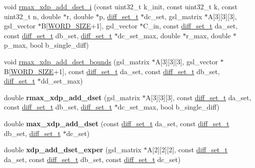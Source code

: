 \begin{DoxyCompactItemize}
\item 
void \hyperlink{xdp-add-diff-set_8cc_a17545da84d6f6dec510d4363ea09e75a}{rmax\-\_\-xdp\-\_\-add\-\_\-dset\-\_\-i} (const uint32\-\_\-t k\-\_\-init, const uint32\-\_\-t k, const uint32\-\_\-t n, double $\ast$r, double $\ast$p, \hyperlink{structdiff__set__t}{diff\-\_\-set\-\_\-t} $\ast$dc\-\_\-set, gsl\-\_\-matrix $\ast$\-A\mbox{[}3\mbox{]}\mbox{[}3\mbox{]}\mbox{[}3\mbox{]}, gsl\-\_\-vector $\ast$\-B\mbox{[}\hyperlink{common_8hh_a92ed8507d1cd2331ad09275c5c4c1c89}{\-W\-O\-R\-D\-\_\-\-S\-I\-Z\-E}+1\mbox{]}, gsl\-\_\-vector $\ast$\-C\-\_\-in, const \hyperlink{structdiff__set__t}{diff\-\_\-set\-\_\-t} da\-\_\-set, const \hyperlink{structdiff__set__t}{diff\-\_\-set\-\_\-t} db\-\_\-set, \hyperlink{structdiff__set__t}{diff\-\_\-set\-\_\-t} $\ast$dc\-\_\-set\-\_\-max, double $\ast$r\-\_\-max, double $\ast$p\-\_\-max, bool b\-\_\-single\-\_\-diff)
\item 
void \hyperlink{xdp-add-diff-set_8cc_a4c95cfd8f710bd876c373a5279ab9075}{rmax\-\_\-xdp\-\_\-add\-\_\-dset\-\_\-bounds} (gsl\-\_\-matrix $\ast$\-A\mbox{[}3\mbox{]}\mbox{[}3\mbox{]}\mbox{[}3\mbox{]}, gsl\-\_\-vector $\ast$\-B\mbox{[}\hyperlink{common_8hh_a92ed8507d1cd2331ad09275c5c4c1c89}{\-W\-O\-R\-D\-\_\-\-S\-I\-Z\-E}+1\mbox{]}, const \hyperlink{structdiff__set__t}{diff\-\_\-set\-\_\-t} da\-\_\-set, const \hyperlink{structdiff__set__t}{diff\-\_\-set\-\_\-t} db\-\_\-set, \hyperlink{structdiff__set__t}{diff\-\_\-set\-\_\-t} $\ast$dd\-\_\-set\-\_\-max)
\item 
\hypertarget{xdp-add-diff-set_8cc_aaa950f2ce67c8a69f7c1cf2a880e7a38}{double {\bfseries rmax\-\_\-xdp\-\_\-add\-\_\-dset} (gsl\-\_\-matrix $\ast$\-A\mbox{[}3\mbox{]}\mbox{[}3\mbox{]}\mbox{[}3\mbox{]}, const \hyperlink{structdiff__set__t}{diff\-\_\-set\-\_\-t} da\-\_\-set, const \hyperlink{structdiff__set__t}{diff\-\_\-set\-\_\-t} db\-\_\-set, \hyperlink{structdiff__set__t}{diff\-\_\-set\-\_\-t} $\ast$dc\-\_\-set\-\_\-max, bool b\-\_\-single\-\_\-diff)}\label{xdp-add-diff-set_8cc_aaa950f2ce67c8a69f7c1cf2a880e7a38}

\item 
\hypertarget{xdp-add-diff-set_8cc_a00e0dee2bb0807f849fac59f55279e8d}{double {\bfseries max\-\_\-xdp\-\_\-add\-\_\-dset} (const \hyperlink{structdiff__set__t}{diff\-\_\-set\-\_\-t} da\-\_\-set, const \hyperlink{structdiff__set__t}{diff\-\_\-set\-\_\-t} db\-\_\-set, \hyperlink{structdiff__set__t}{diff\-\_\-set\-\_\-t} $\ast$dc\-\_\-set)}\label{xdp-add-diff-set_8cc_a00e0dee2bb0807f849fac59f55279e8d}

\item 
\hypertarget{xdp-add-diff-set_8cc_a52f7ccb7ba4d5a4fbb5b6e6c40d3e467}{double {\bfseries xdp\-\_\-add\-\_\-dset\-\_\-exper} (gsl\-\_\-matrix $\ast$\-A\mbox{[}2\mbox{]}\mbox{[}2\mbox{]}\mbox{[}2\mbox{]}, const \hyperlink{structdiff__set__t}{diff\-\_\-set\-\_\-t} da\-\_\-set, const \hyperlink{structdiff__set__t}{diff\-\_\-set\-\_\-t} db\-\_\-set, const \hyperlink{structdiff__set__t}{diff\-\_\-set\-\_\-t} dc\-\_\-set)}\label{xdp-add-diff-set_8cc_a52f7ccb7ba4d5a4fbb5b6e6c40d3e467}


\end{DoxyCompactItemize}
